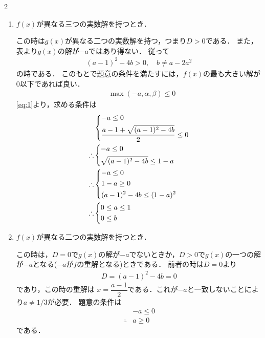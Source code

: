 \documentclass[../../main.tex]{subfiles}
\begin{document}
\begin{multicols}{2}
  \begin{enumerate}
    \item $f(x)$が異なる三つの実数解を持つとき．

      この時は$g(x)$が異なる二つの実数解を持つ，つまり$D>0$である．
      また，表より$g(x)$の解が$-a$ではあり得ない．
      従って
      \begin{align}
        (a-1)^2-4b > 0, \quad
        b \neq a-2a^2
      \end{align}
      の時である．
      このもとで題意の条件を満たすには，$f(x)$の最も大きい解が$0$以下であれば良い．
      \begin{align}
        & \max(-a, \alpha, \beta) \le 0
      \end{align}
      \cref{eq:1}より，求める条件は
      \begin{align}
        &
        \begin{dcases}
          -a \le 0 \\
          \dfrac{a-1 + \sqrt{(a-1)^2-4b}}{2} \le 0
        \end{dcases} \\
        \therefore
        &
        \begin{dcases}
          -a \le 0 \\
          \sqrt{(a-1)^2-4b} \le 1-a
        \end{dcases}                    \\
        \therefore
        &
        \begin{dcases}
          -a \le 0  \\
          1-a \ge 0 \\
          (a-1)^2-4b \le (1-a)^2
        \end{dcases}                       \\
        \therefore
        &
        \begin{dcases}
          0 \le a \le 1 \\
          0 \le b
        \end{dcases}
      \end{align}
    \item $f(x)$が異なる二つの実数解を持つとき．

      この時は，$D=0$で$g(x)$の解が$-a$でないときか，$D>0$で$g(x)$の一つの解が$-a$となる($-a$が$f$の重解となる)ときである．
      前者の時は$D=0$より
      \begin{align}
        D = (a-1)^2 -4b = 0
      \end{align}
      であり，この時の重解は $x = \dfrac{a-1}{2}$である．これが$-a$と一致しないことにより$a\neq 1/3$が必要．
      題意の条件は
      \begin{align}
        & -a \le 0 \\
        \therefore
        & a \ge 0
      \end{align}
      である．


\end{enumerate}
\end{multicols}
\end{document}
